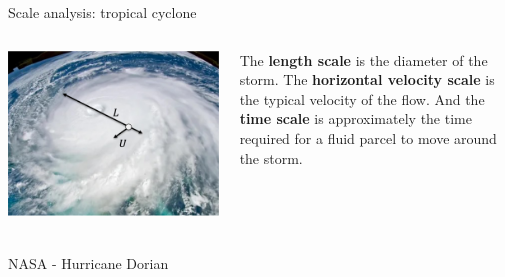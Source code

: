 \documentclass[aspectratio=169,xcolor=dvipsnames]{beamer}
\newcommand\credit[2]{
        \\ \vspace{-0.5em}
        {\color{gray}\scriptsize
        \hfill
        #1
        \hspace{#2}}
        }
\begin{document}
\begin{frame}{Scale analysis: tropical cyclone}
\begin{columns}
    \begin{column}{0.5\textwidth}
        \includegraphics[width=\textwidth]{figs/Fig-nasa-dorian-scale.png}
        \credit{NASA - Hurricane Dorian}{-5pt}
    \end{column}
    \begin{column}{0.4\textwidth}
        The \textbf{length scale} is the diameter of the storm. The \textbf{horizontal velocity scale} is the typical velocity of the flow. And the \textbf{time scale} is approximately the time required for a fluid parcel to move around the storm.
    \end{column}
    
\end{columns}
\end{frame}
\end{document}
